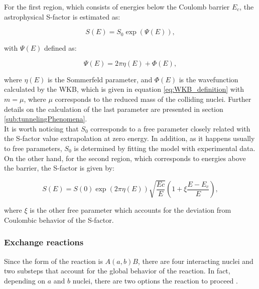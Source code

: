 \documentclass[openany]{book}
\begin{document}
For the first region, which consists of energies below the Coulomb barrier $E_c$, the astrophysical S-factor is estimated as:

\begin{equation}  \label{eq:potential_Yakovlev_sfactor_belowBarrier}
	S(E) = S_0 \exp ({\Psi(E)} ),
\end{equation}

with $\Psi(E)$ defined as: 

\begin{equation}  \label{eq:potential_Yakovlev_psiWKB}
	\Psi(E) = 2\pi\eta(E) + \Phi(E),
\end{equation}

where $\eta(E)$ is the Sommerfeld parameter, and $\Phi(E)$ is the wavefunction calculated by the WKB, which is given in equation \ref{eq:WKB_definition} with $m = \mu$, where $\mu$ corresponds to the reduced mass of the colliding nuclei. Further details on the calculation of the last parameter are presented in section \ref{sub:tunnelingPhenomena}. \\

It is worth noticing that $S_0$ corresponds to a free parameter closely related with the S-factor value extrapolation at zero energy. In addition, as it happens usually to free parameters, $S_0$ is determined by fitting the model with experimental data. \\

On the other hand, for the second region, which corresponds to energies above the barrier, the S-factor is given by:

\begin{equation}  \label{eq:potential_Yakovlev_sfactor_aboveBarrier}
	S(E) = S(0) \exp ({2\pi\eta(E)}) \sqrt{\frac{Ec}{E}} \left( 1 + \xi\frac{E - E_c}{E} \right),
\end{equation}

where $\xi$ is the other free parameter which accounts for the deviation from Coulombic behavior of the S-factor.  \\

\subsubsection{Exchange reactions} \label{ssub:potential_calculations_exchange}

Since the form of the reaction is $A(a, b)B$, there are four interacting nuclei and two substeps that account for the global behavior of the reaction. In fact, depending on  $a$ and $b$ nuclei, there are two options the reaction to proceed \cite{xu_takahashi_goriely_arnould_ohta_utsunomiya_2013}. \\
\end{document}
